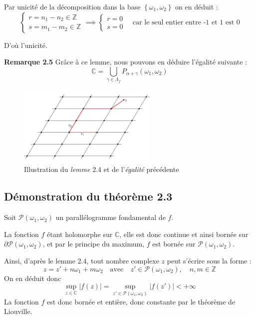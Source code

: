 \documentclass{article}
\begin{document}
Par unicité de la décomposition dans la base ${\left\{ \omega_1, \omega_2\right\}}$ on en déduit :
\[
\begin{cases}
r = n_1 - n_2 \in \mathbb{Z} \\
s = m_1 - m_2 \in \mathbb{Z}
\end{cases}
\implies
\begin{cases}
r = 0 \\
s = 0
\end{cases}
\quad \text{car le seul entier entre -1 et 1 est 0}
\]

D'où l'unicité.

\textbf{Remarque 2.5}
Grâce à ce lemme, nous pouvons en déduire l'égalité suivante :
\[
\mathbb{C} = \bigcup_{\gamma \in \Lambda_{f}} P_{\alpha + \gamma} (\omega_1, \omega_2)
\]
\begin{figure}[h]
    \centering
    \includegraphics[width=0.6\textwidth]{lemme.jpeg}
    \caption{Illustration du \textit{lemme} 2.4 et de l'\textit{égalité} précédente}
\end{figure}



\subsection{Démonstration du théorème 2.3}

Soit $\mathcal{P}(\omega_1, \omega_2)$ un parallélogramme fondamental de $f$.

La fonction $f$ étant holomorphe sur $\mathbb{C}$, elle est donc continue et ainsi bornée sur $\partial \mathcal{P}(\omega_1, \omega_2)$, et par le principe du maximum, $f$ est bornée sur $\mathcal{P}(\omega_1, \omega_2)$.

Ainsi, d'après le lemme 2.4, tout nombre complexe $z$ peut s'écrire sous la forme :
\[
z = z' + n \omega_1 + m \omega_2 \quad \text{avec} \quad z' \in \mathcal{P}(\omega_1, \omega_2), \quad n, m \in \mathbb{Z}
\]
On en déduit donc 
\[
\sup_{z \in \mathbb{C}} |f(z)| = \sup_{z' \in \mathcal{P}(\omega_1, \omega_2)} |f(z')| < +\infty
\]
La fonction $f$ est donc bornée et entière, donc constante par le théorème de Liouville.
\end{document}

